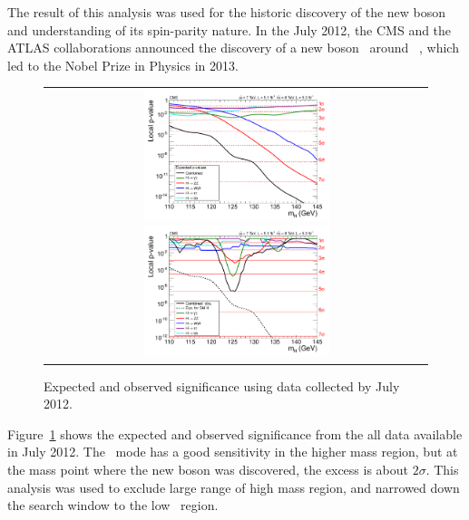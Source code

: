 The result of this analysis was used for the historic discovery of the new boson 
and understanding of its spin-parity nature. In the July 2012, the CMS and 
the ATLAS collaborations announced the discovery of a new boson~\cite{Chatrchyan:2012ufa,Aad:2012tfa}
around ~\GeV, which led to the Nobel Prize in Physics in 2013. 
\begin{figure}[htp] 
\centering 
\begin{tabular}{c} 
\includegraphics[width=0.5\textwidth]{figures/fig1.pdf} 
\includegraphics[width=0.5\textwidth]{figures/fig15.pdf} 
\end{tabular} 
\caption{Expected and observed significance using data collected by July 2012.} 
\label{fig:ichep2012} 
\end{figure} 
Figure~\ref{fig:ichep2012} shows the expected and observed significance from 
the all data available in July 2012. The \hww\ mode has a good sensitivity 
in the higher mass region, but at the mass point where the new boson was 
discovered, the excess is about $2\sigma$. This analysis was used to 
exclude large range of high mass region, and narrowed down the search window
to the low \mHi\ region. 

